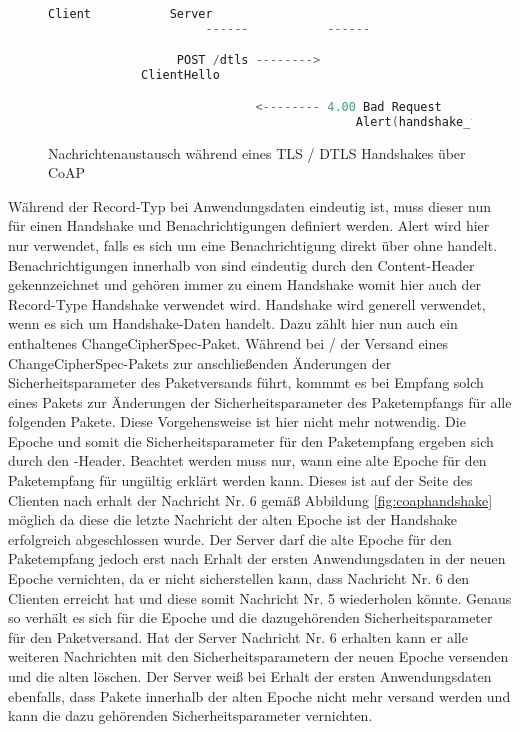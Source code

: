 {\begin{figure}[ht]
  \centering
  \begin{lstlisting}[language=c]
                      Client           Server
                      ------           ------

                  POST /dtls -------->
             ClientHello

                             <-------- 4.00 Bad Request
                                           Alert(handshake_failure)
  \end{lstlisting}
  \caption{Nachrichtenaustausch während eines TLS / DTLS Handshakes über CoAP}
  \label{fig:coaphandshakefail}
\end{figure}

Während der Record-Typ bei Anwendungsdaten eindeutig ist, muss dieser nun für einen Handshake und Benachrichtigungen definiert werden.
Alert wird hier nur verwendet, falls es sich um eine Benachrichtigung direkt über  ohne  handelt.
Benachrichtigungen innerhalb von  sind eindeutig durch den Content-Header gekennzeichnet und gehören immer zu einem Handshake
womit hier auch der Record-Type Handshake verwendet wird. Handshake wird generell verwendet, wenn es sich um Handshake-Daten handelt.
Dazu zählt hier nun auch ein enthaltenes ChangeCipherSpec-Paket. Während bei / der Versand eines ChangeCipherSpec-Pakets
zur anschließenden Änderungen der Sicherheitsparameter des Paketversands führt, kommmt es bei Empfang solch eines Pakets zur Änderungen der
Sicherheitsparameter des Paketempfangs für alle folgenden Pakete. Diese Vorgehensweise ist hier nicht mehr notwendig. Die Epoche und somit
die Sicherheitsparameter für den Paketempfang ergeben sich durch den -Header. Beachtet werden muss nur, wann eine alte Epoche
für den Paketempfang für ungültig erklärt werden kann. Dieses ist auf der Seite des Clienten nach erhalt der Nachricht Nr. 6 gemäß Abbildung
\ref{fig:coaphandshake} möglich da diese die letzte Nachricht der alten Epoche ist der Handshake erfolgreich abgeschlossen wurde.
Der Server darf die alte Epoche für den Paketempfang jedoch erst nach Erhalt der ersten Anwendungsdaten in der neuen Epoche vernichten, da
er nicht sicherstellen kann, dass Nachricht Nr. 6 den Clienten erreicht hat und diese somit Nachricht Nr. 5 wiederholen könnte.
Genaus so verhält es sich für die Epoche und die dazugehörenden Sicherheitsparameter für den Paketversand. Hat der Server Nachricht Nr. 6
erhalten kann er alle weiteren Nachrichten mit den Sicherheitsparametern der neuen Epoche versenden und die alten löschen. Der Server
weiß bei Erhalt der ersten Anwendungsdaten ebenfalls, dass Pakete innerhalb der alten Epoche nicht mehr versand werden und kann die
dazu gehörenden Sicherheitsparameter vernichten.

}
